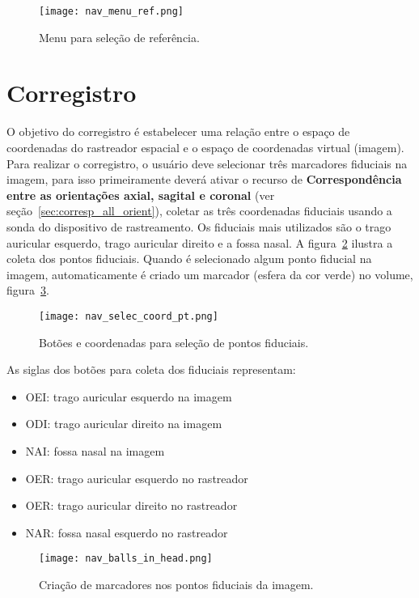 \begin{figure}[!htb]
\centering
\texttt{[image: nav\_menu\_ref.png]}
\caption{Menu para seleção de referência.}
\label{fig:nav_menu_ref}
\end{figure}

\section{Corregistro}
\label{sec:corregistro}

O objetivo do corregistro é estabelecer uma relação entre o espaço de coordenadas do rastreador espacial e o espaço de coordenadas virtual (imagem). Para realizar o corregistro, o usuário deve selecionar três marcadores fiduciais na imagem, para isso primeiramente deverá ativar o recurso de \textbf{Correspondência entre as orientações axial, sagital e coronal} (ver seção~\ref{sec:corresp_all_orient}), coletar as três coordenadas fiduciais usando a sonda do dispositivo de rastreamento. Os fiduciais mais utilizados são o trago auricular esquerdo, trago auricular direito e a fossa nasal. A figura~\ref{fig:nav_selec_coord} ilustra a coleta dos pontos fiduciais. Quando é selecionado algum ponto fiducial na imagem, automaticamente é criado um marcador (esfera da cor verde) no volume, figura~\ref{fig:nav_balls_in_head}.

\begin{figure}[!htb]
\centering
\texttt{[image: nav\_selec\_coord\_pt.png]}
\caption{Botões e coordenadas para seleção de pontos fiduciais.}
\label{fig:nav_selec_coord}
\end{figure}

As siglas dos botões para coleta dos fiduciais representam:

\begin{itemize}
	\item OEI: trago auricular esquerdo na imagem
	\item ODI: trago auricular direito na imagem
	\item NAI: fossa nasal na imagem
	\item OER: trago auricular esquerdo no rastreador
	\item OER: trago auricular direito no rastreador
	\item NAR: fossa nasal esquerdo no rastreador
\end{itemize}

\begin{figure}[!htb]
\centering
\texttt{[image: nav\_balls\_in\_head.png]}
\caption{Criação de marcadores nos pontos fiduciais da imagem.}
\label{fig:nav_balls_in_head}
\end{figure}



